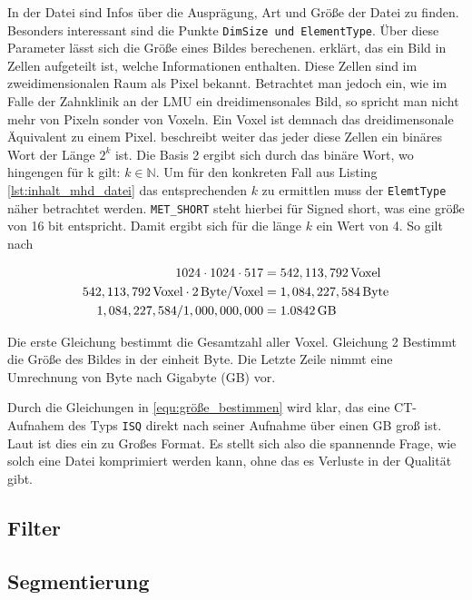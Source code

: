 In der Datei sind Infos über die Ausprägung, Art und Größe der Datei zu finden.
Besonders interessant sind die Punkte \texttt{DimSize und ElementType}. Über
diese Parameter lässt sich die Größe eines Bildes berechenen. \citet[Seite 10-11]{burger2009}
erklärt, das ein Bild in Zellen aufgeteilt ist, welche Informationen enthalten.
Diese Zellen sind im zweidimensionalen Raum als Pixel bekannt. Betrachtet man jedoch
ein, wie im Falle der Zahnklinik an der LMU ein dreidimensonales Bild, so spricht
man nicht mehr von Pixeln sonder von Voxeln. Ein Voxel ist demnach das
dreidimensonale Äquivalent zu einem Pixel. \citet[Seite 10-11]{burger2009} beschreibt
weiter das jeder diese Zellen ein binäres Wort der Länge $2^{k}$ ist. Die Basis
2 ergibt sich durch das binäre Wort, wo hingengen für k gilt: $k \in \mathbb{N}$.
Um für den konkreten Fall aus Listing \ref{lst:inhalt_mhd_datei} das entsprechenden
$k$ zu ermittlen muss der \texttt{ElemtType} näher betrachtet werden. \texttt{MET\_SHORT}
steht hierbei für Signed short, was eine größe von 16 bit entspricht. Damit
ergibt sich für die länge $k$ ein Wert von 4. So gilt nach \citet[Seite 10-11]{burger2009}

\begin{align}
	\label{equ:größe_bestimmen}1024 \cdot 1024 \cdot 517    & = 542,113,792 \, \text{Voxel}\notag  \\
	542,113,792 \, \text{Voxel}\cdot 2 \, \text{Byte/Voxel} & = 1,084,227,584 \, \text{Byte}\notag \\
	1,084,227,584 / 1,000,000,000                           & = 1.0842 \, \text{GB}
\end{align}

Die erste Gleichung bestimmt die Gesamtzahl aller Voxel. Gleichung 2 Bestimmt die
Größe des Bildes in der einheit Byte. Die Letzte Zeile nimmt eine Umrechnung von
Byte nach Gigabyte (GB) vor.

Durch die Gleichungen in \ref{equ:größe_bestimmen} wird klar, das eine CT-Aufnahem
des Typs \texttt{ISQ} direkt nach seiner Aufnahme über einen GB groß ist. Laut \citet{poliklinikLMU}
ist dies ein zu Großes Format. Es stellt sich also die spannennde Frage, wie
solch eine Datei komprimiert werden kann, ohne das es Verluste in der Qualität gibt.

\subsection{Filter}

\subsection{Segmentierung}


